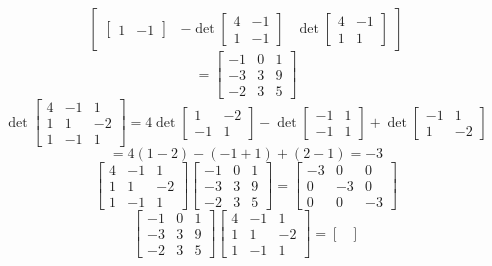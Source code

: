 \documentclass[12pt]{article}
\begin{document}
\begin{itemize}
$$\begin{bmatrix}
\begin{bmatrix}
1 & -1
\end{bmatrix} & -\det\begin{bmatrix}
4 & -1 \\
1 & -1
\end{bmatrix} & \det\begin{bmatrix}
4 & -1 \\
1 & 1
\end{bmatrix}
\end{bmatrix}$$
$$= \begin{bmatrix}
-1 & 0 & 1 \\
-3 & 3 & 9 \\
-2 & 3 & 5
\end{bmatrix}$$
$$\det\begin{bmatrix}
4 & -1 & 1 \\
1 & 1 & -2 \\
1 & -1 & 1
\end{bmatrix} = 4\det\begin{bmatrix}
1 & -2 \\
-1 & 1
\end{bmatrix} - \det\begin{bmatrix}
-1 & 1 \\
-1 & 1
\end{bmatrix} + \det\begin{bmatrix}
-1 & 1 \\
1 & -2
\end{bmatrix} $$
$$= 4(1 - 2) - (-1 + 1) + (2 - 1) = -3$$
$$\begin{bmatrix}
4 & -1 & 1 \\
1 & 1 & -2 \\
1 & -1 & 1
\end{bmatrix}\begin{bmatrix}
-1 & 0 & 1 \\
-3 & 3 & 9 \\
-2 & 3 & 5
\end{bmatrix} = \begin{bmatrix}
-3 & 0 & 0 \\
0 & -3 & 0 \\
0 & 0 & -3
\end{bmatrix}$$
$$\begin{bmatrix}
-1 & 0 & 1 \\
-3 & 3 & 9 \\
-2 & 3 & 5
\end{bmatrix}\begin{bmatrix}
4 & -1 & 1 \\
1 & 1 & -2 \\
1 & -1 & 1
\end{bmatrix} = \begin{bmatrix}

\end{bmatrix}$$
\end{itemize}
\end{document}
